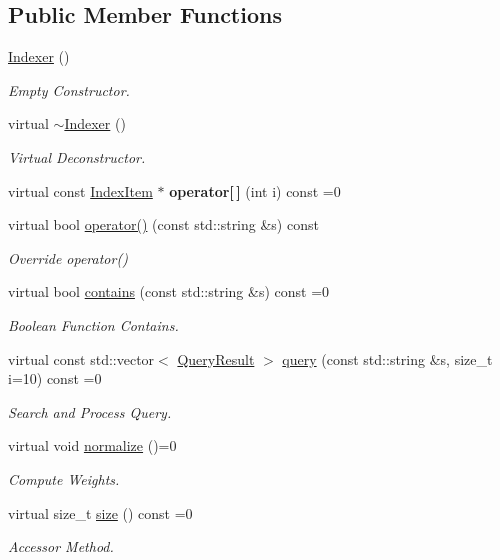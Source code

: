 \subsection*{Public Member Functions}
\begin{DoxyCompactItemize}
\item 
\mbox{\label{class_indexer_ac4c8c21c68d62185ceddbad8781e3b67}} 
\hyperlink{class_indexer_ac4c8c21c68d62185ceddbad8781e3b67}{Indexer} ()
\begin{DoxyCompactList}\small\item\em Empty Constructor. \end{DoxyCompactList}\item 
\mbox{\label{class_indexer_a0fd33d8c08067e6042d189fdf343af01}} 
virtual \hyperlink{class_indexer_a0fd33d8c08067e6042d189fdf343af01}{$\sim$\+Indexer} ()
\begin{DoxyCompactList}\small\item\em Virtual Deconstructor. \end{DoxyCompactList}\item 
\mbox{\label{class_indexer_a3396f2205b557f583d0dfc756942244e}} 
virtual const \hyperlink{class_index_item}{Index\+Item} $\ast$ {\bfseries operator\mbox{[}$\,$\mbox{]}} (int i) const =0
\item 
virtual bool \hyperlink{class_indexer_aa2be6d79e0425aafd10b98118fcbb4ee}{operator()} (const std\+::string \&s) const
\begin{DoxyCompactList}\small\item\em Override operator() \end{DoxyCompactList}\item 
virtual bool \hyperlink{class_indexer_abb847ff86be1ec9265fb53a5ac6f7008}{contains} (const std\+::string \&s) const =0
\begin{DoxyCompactList}\small\item\em Boolean Function Contains. \end{DoxyCompactList}\item 
virtual const std\+::vector$<$ \hyperlink{class_query_result}{Query\+Result} $>$ \hyperlink{class_indexer_a8d98ba740db6f5f8521d557bf908aead}{query} (const std\+::string \&s, size\+\_\+t i=10) const =0
\begin{DoxyCompactList}\small\item\em Search and Process Query. \end{DoxyCompactList}\item 
virtual void \hyperlink{class_indexer_a84f50c7bac96cd5a8daa18899a39bb5d}{normalize} ()=0
\begin{DoxyCompactList}\small\item\em Compute Weights. \end{DoxyCompactList}\item 
virtual size\+\_\+t \hyperlink{class_indexer_ab8b3e17bbf16d54e1e773a1630abb138}{size} () const =0
\begin{DoxyCompactList}\small\item\em Accessor Method. \end{DoxyCompactList}\end{DoxyCompactItemize}
